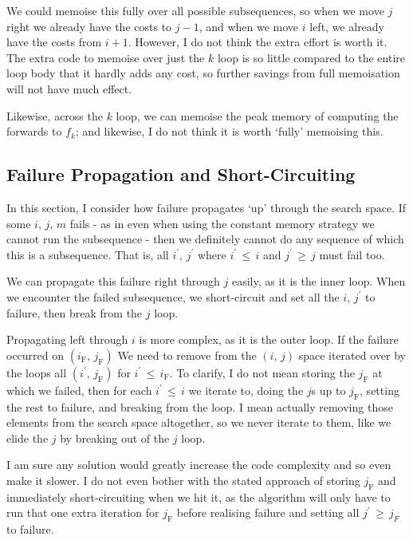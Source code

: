 We could memoise this fully over all possible subsequences, so when we move \(j\) right we already have the costs to \(j-1\), and when we move \(i\) left, we already have the costs from \(i+1\).
However, I do not think the extra effort is worth it.
The extra code to memoise over just the \(k\) loop is so little compared to the entire loop body that it hardly adds any cost, so further savings from full memoisation will not have much effect.

Likewise, across the \(k\) loop, we can memoise the peak memory of computing the forwards to \(f_k\); and likewise, I do not think it is worth `fully' memoising this.

\subsection{Failure Propagation and Short-Circuiting}
In this section, I consider how failure propagates `up' through the search space.
If some \(i,\,j,\,m\) fails - as in even when using the constant memory strategy we cannot run the subsequence - then we definitely cannot do any sequence of which this is a subsequence.
That is, all \(i^\prime,\, j^\prime\) where \(i^\prime \,\leq\, i\) and \(j^\prime \,\geq\, j\) must fail too.

We can propagate this failure right through \(j\) easily, as it is the inner loop.
When we encounter the failed subsequence, we short-circuit and set all the \(i,\, j^\prime\) to failure, then break from the \(j\) loop.

Propagating left through \(i\) is more complex, as it is the outer loop.
If the failure occurred on \((i_\mathrm{F},\, j_\mathrm{F})\) We need to remove from the \((i,\,j)\) space iterated over by the loops all \((i^\prime,\, j_{\mathrm{F}})\) for \(i^\prime \,\leq\, i_\mathrm{F}\).
To clarify, I do not mean storing the \(j_\mathrm{F}\) at which we failed, then for each \(i^\prime \,\leq\, i\) we iterate to, doing the \(j\)s up to \(j_\mathrm{F}\), setting the rest to failure, and breaking from the loop.
I mean actually removing those elements from the search space altogether, so we never iterate to them, like we elide the \(j\) by breaking out of the \(j\) loop.

I am sure any solution would greatly increase the code complexity and so even make it slower.
I do not even bother with the stated approach of storing \(j_\mathrm{F}\) and immediately short-circuiting when we hit it, as the algorithm will only have to run that one extra iteration for \(j_\mathrm{F}\) before realising failure and setting all \(j^\prime \,\geq\, j_{F}\) to failure.


